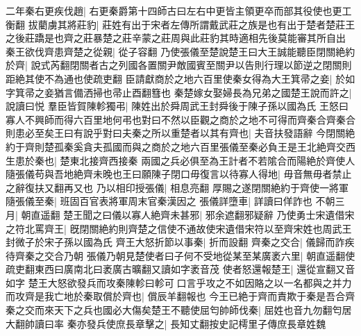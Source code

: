 二年秦右更疾伐趙|{
	右更秦爵第十四師古曰左右中更皆主領更卒而部其役使也更工衡翻}
拔藺虜其將莊豹|{
	莊姓有出于宋者左傳所謂戴武莊之族是也有出于楚者楚莊王之後莊蹻是也齊之莊暴楚之莊辛蒙之莊周與此莊豹其時適相先後莫能審其所自出}
秦王欲伐齊患齊楚之從親|{
	從子容翻}
乃使張儀至楚說楚王曰大王誠能聽臣閉關絶約於齊|{
	說式芮翻閉關者古之列國各置關尹敵國賓至關尹以告則行理以節逆之閉關則距絶其使不為通也使疏吏翻}
臣請獻商於之地六百里使秦女得為大王箕帚之妾|{
	於如字箕帚之妾猶言備洒掃也帚止酉翻篲也}
秦楚嫁女娶婦長為兄弟之國楚王說而許之|{
	說讀曰悦}
羣臣皆賀陳軫獨弔|{
	陳姓出於舜周武王封舜後于陳子孫以國為氏}
王怒曰寡人不興師而得六百里地何弔也對曰不然以臣觀之商於之地不可得而齊秦合齊秦合則患必至矣王曰有說乎對曰夫秦之所以重楚者以其有齊也|{
	夫音扶發語辭}
今閉關絶約于齊則楚孤秦奚貪夫孤國而與之商於之地六百里張儀至秦必負王是王北絶齊交西生患於秦也|{
	楚東北接齊西接秦}
兩國之兵必俱至為王計者不若隂合而陽絶於齊使人隨張儀苟與吾地絶齊未晚也王曰願陳子閉口毋復言以待寡人得地|{
	毋音無毋者禁止之辭復扶又翻再又也}
乃以相印授張儀|{
	相息亮翻}
厚賜之遂閉關絶約于齊使一將軍隨張儀至秦|{
	班固百官表將軍周末官秦漢因之}
張儀詳墮車|{
	詳讀曰佯詐也}
不朝三月|{
	朝直遥翻}
楚王聞之曰儀以寡人絶齊未甚邪|{
	邪余遮翻邪疑辭}
乃使勇士宋遺借宋之符北罵齊王|{
	旣閉關絶約則齊楚之信使不通故使宋遺借宋符以至齊宋姓也周武王封微子於宋子孫以國為氏}
齊王大怒折節以事秦|{
	折而設翻}
齊秦之交合|{
	儀歸而詐疾待齊秦之交合乃朝}
張儀乃朝見楚使者曰子何不受地從某至某廣袤六里|{
	朝直遥翻使疏吏翻東西曰廣南北曰袤廣古曠翻又讀如字袤音茂}
使者怒還報楚王|{
	還從宣翻又音如字}
楚王大怒欲發兵而攻秦陳軫曰軫可口言乎攻之不如因賂之以一名都與之并力而攻齊是我亡地於秦取償於齊也|{
	償辰羊翻報也}
今王已絶于齊而責欺于秦是吾合齊秦之交而來天下之兵也國必大傷矣楚王不聽使屈匄帥師伐秦|{
	屈姓也音九勿翻匄居大翻帥讀曰率}
秦亦發兵使庶長章擊之|{
	長知丈翻按史記樗里子傳庶長章姓魏}


